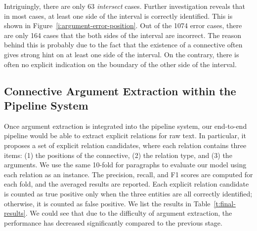 

Intriguingly, there are only 63 \textit{intersect} cases. Further investigation
reveals that in most cases, at least one side of the interval is correctly
identified. This is shown in Figure~\ref{i:argument-error-position}. Out of
the 1074 error cases, there are only 164 cases that the both sides of the
interval are incorrect. The reason behind this is probably due to the fact that
the existence of a connective often gives strong hint on at least one side of
the interval. On the contrary, there is often no explicit indication on the boundary
of the other side of the interval.



\subsection{Connective Argument Extraction within the Pipeline System}

Once argument extraction is integrated into the pipeline system, our end-to-end
pipeline would be able to extract explicit relations for raw text. In particular,
it proposes a set of explicit relation candidates, where each relation contains
three items: (1) the positions of the connective, (2) the relation type, and
(3) the arguments. We use the same 10-fold for paragraphs to evaluate our model
using each relation
as an instance. The precision, recall, and F1 scores are computed for each fold,
and the averaged results are reported. Each explicit relation candidate is
counted as true positive only when the three entities are all correctly
identified; otherwise, it is counted as false positive. We list the results
in Table~\ref{t:final-results}. We could see that due to the difficulty
of argument extraction, the performance has decreased significantly compared
to the previous stage.


